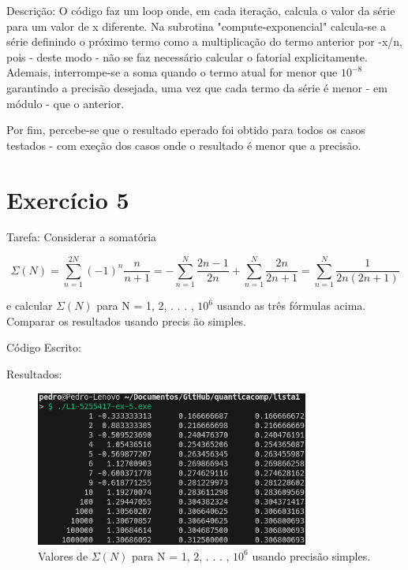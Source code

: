 \documentclass[12pt, a4paper]{article} %
\begin{document}
    Descri\c{c}\~ao: O c\'odigo faz um loop onde, em cada itera\c{c}\~ao, calcula o valor da s\'erie para um valor de x diferente. Na subrotina "compute-exponencial" calcula-se a s\'erie definindo o pr\'oximo termo como a multiplica\c{c}\~ao do termo anterior por -x/n, pois - deste modo - n\~ao se faz necess\'ario calcular o fatorial explicitamente. Ademais, interrompe-se a soma quando o termo atual for menor que $10^{-8}$ garantindo a precis\~ao desejada, uma vez que cada termo da s\'erie \'e menor - em m\'odulo - que o anterior.

    Por fim, percebe-se que o resultado eperado foi obtido para todos os casos testados - com exe\c{c}\~ao dos casos onde o resultado \'e menor que a precis\~ao.

\section{Exerc\'icio 5}

    Tarefa: Considerar a somat\'oria

    \begin{equation} \Sigma (N) = \sum_{n=1}^{2N} (-1)^n\frac{n}{n+1} = - \sum_{n=1}^N \frac{2n-1}{2n} + \sum_{n=1}^N \frac{2n}{2n+1} = \sum_{n=1}^N \frac{1}{2n(2n+1)} \end{equation}

    e calcular $\Sigma (N)$ para N = 1, 2, . . . , $10^6$ usando as tr\^es f\'ormulas acima. Comparar os resultados usando precis \~ao simples.

    C\'odigo Escrito:
    

    Resultados:
    \begin{figure}[H]
        \centering
        \includegraphics[width=0.8\textwidth]{../images/results-ex5.png}
        \caption{Valores de $\Sigma (N)$ para N = 1, 2, . . . , $10^6$ usando precis\~ao simples.}
    \end{figure}
\end{document}
